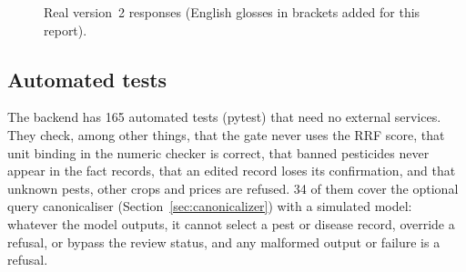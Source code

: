 \begin{figure}[htbp]
\vspace{4pt}
\caption{Real version~2 responses (English glosses in brackets added for this report).}
\label{fig:examples}
\end{figure}

\subsection{Automated tests}
The backend has 165 automated tests (pytest) that need no external services. They check,
among other things, that the gate never uses the RRF score, that unit binding in the
numeric checker is correct, that banned pesticides never appear in the fact records, that
an edited record loses its confirmation, and that unknown pests, other crops and prices
are refused. 34 of them cover the optional query canonicaliser
(Section~\ref{sec:canonicalizer}) with a simulated model: whatever the model outputs, it
cannot select a pest or disease record, override a refusal, or bypass the review status,
and any malformed output or failure is a refusal.
